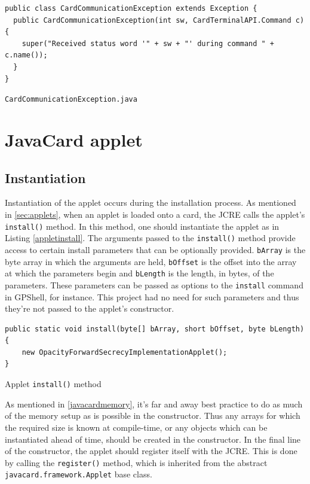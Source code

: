 \documentclass[12pt,a4paper,twoside,openright]{report}
\begin{document}
\begin{listing}
\begin{verbatim}
public class CardCommunicationException extends Exception {
  public CardCommunicationException(int sw, CardTerminalAPI.Command c) {
    super("Received status word '" + sw + "' during command " + c.name());
  }
}
\end{verbatim}
\caption{\texttt{CardCommunicationException.java}}
\label{commexception}
\end{listing}

\section{JavaCard applet}

\subsection{Instantiation}

Instantiation of the applet occurs during the installation process. As mentioned in \autoref{sec:applets}, when an applet is loaded onto a card, the JCRE calls the applet's \texttt{install()} method. In this method, one should instantiate the applet as in Listing \autoref{appletinstall}. The arguments passed to the \texttt{install()} method provide access to certain install parameters that can be optionally provided. \texttt{bArray} is the byte array in which the arguments are held, \texttt{bOffset} is the offset into the array at which the parameters begin and \texttt{bLength} is the length, in bytes, of the parameters. These parameters can be passed as options to the \texttt{install} command in GPShell, for instance. This project had no need for such parameters and thus they're not passed to the applet's constructor.

\begin{listing}
\begin{verbatim}
public static void install(byte[] bArray, short bOffset, byte bLength) {
    new OpacityForwardSecrecyImplementationApplet();
}
\end{verbatim}
\caption{Applet \texttt{install()} method}
\label{appletinstall}
\end{listing}

\noindent
As mentioned in \autoref{javacardmemory}, it's far and away best practice to do as much of the memory setup as is possible in the constructor. Thus any arrays for which the required size is known at compile-time, or any objects which can be instantiated ahead of time, should be created in the constructor. In the final line of the constructor, the applet should register itself with the JCRE. This is done by calling the \texttt{register()} method, which is inherited from the abstract \texttt{javacard.framework.Applet} base class.
\end{document}
